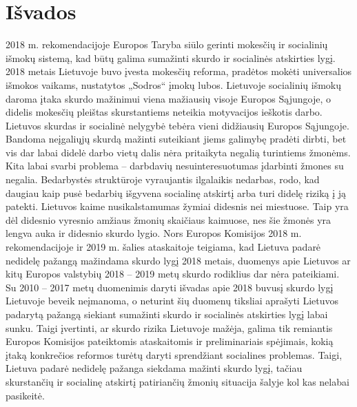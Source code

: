 \documentclass[12pt,titlepage]{article}
\begin{document}
\section{Išvados}
\justify
\hspace{\parindent}
2018 m. rekomendacijoje Europos Taryba siūlo gerinti mokesčių ir socialinių išmokų sistemą, kad būtų galima sumažinti skurdo ir socialinės atskirties lygį. 2018 metais Lietuvoje buvo įvesta mokesčių reforma, pradėtos mokėti universalios išmokos vaikams, nustatytos „Sodros“ įmokų lubos. Lietuvoje socialinių išmokų daroma įtaka skurdo mažinimui viena mažiausių visoje Europos Sąjungoje, o didelis mokesčių pleištas skurstantiems neteikia motyvacijos ieškotis darbo. Lietuvos skurdas ir socialinė nelygybė tebėra vieni didžiausių Europos Sąjungoje. Bandoma neįgaliųjų skurdą mažinti suteikiant jiems galimybę pradėti dirbti, bet vis dar labai didelė darbo vietų dalis nėra pritaikyta negalią turintiems žmonėms. Kita labai svarbi problema – darbdavių nesuinteresuotumas įdarbinti žmones su negalia. Bedarbystės struktūroje vyraujantis ilgalaikis nedarbas, rodo, kad daugiau kaip pusė bedarbių išgyvena socialinę atskirtį arba turi didelę riziką į ją patekti. Lietuvos kaime nusikalstamumas žymiai didesnis nei miestuose. Taip yra dėl didesnio vyresnio amžiaus žmonių skaičiaus kaimuose, nes šie žmonės yra lengva auka ir didesnio skurdo lygio.
Nors Europos Komisijos 2018 m. rekomendacijoje ir 2019 m. šalies ataskaitoje teigiama, kad Lietuva padarė nedidelę pažangą mažindama skurdo lygį 2018 metais, duomenys apie Lietuvos ar kitų Europos valstybių 2018 – 2019 metų skurdo rodiklius dar nėra pateikiami. Su 2010 – 2017 metų duomenimis daryti išvadas apie 2018 buvusį skurdo lygį Lietuvoje beveik neįmanoma, o neturint šių duomenų tiksliai aprašyti Lietuvos padarytą pažangą siekiant sumažinti skurdo ir socialinės atskirties lygį labai sunku. Taigi įvertinti, ar skurdo rizika Lietuvoje mažėja, galima tik remiantis Europos Komisijos pateiktomis ataskaitomis ir preliminariais spėjimais, kokią įtaką konkrečios reformos turėtų daryti sprendžiant socialines problemas. Taigi, Lietuva padarė nedidelę pažanga siekdama mažinti skurdo lygį, tačiau skurstančių ir socialinę atskirtį patiriančių žmonių situacija šalyje kol kas nelabai pasikeitė.\parencite{babachinaite2006saugumo}
\justify

\newpage
\nocite{*}	
\printbibliography[title={Literatūra}]	
\end{document}
